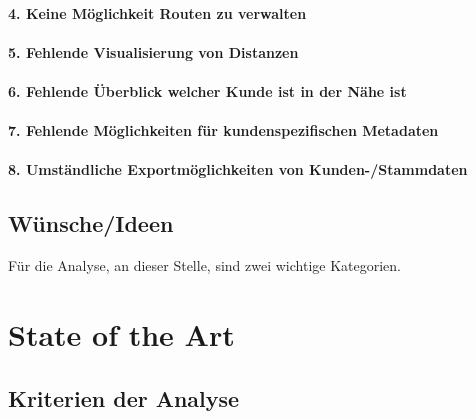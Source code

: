 \documentclass[../Bachelorarbeit.tex]{subfiles}
\begin{document}
\paragraph*{4. Keine Möglichkeit Routen zu verwalten }
\label{p4}

\paragraph*{5. Fehlende Visualisierung von Distanzen}
\label{p5}

\paragraph*{6. Fehlende Überblick welcher Kunde ist in der Nähe ist}
\label{p6}

\paragraph*{7. Fehlende Möglichkeiten für kundenspezifischen Metadaten}
\label{p7}

\paragraph*{8. Umständliche Exportmöglichkeiten von Kunden-/Stammdaten}
\label{p8}


\subsection*{Wünsche/Ideen}
\label{subsubsec:Ergebnisse der Interviews:ideen}
 
Für die Analyse, an dieser Stelle, sind zwei wichtige Kategorien.  


\section{State of the Art}
\label{chap:analyse:sec:sota}


\subsection{Kriterien der Analyse}
\label{chap:analyse:sec:sota:sec:kriterien_der_analyse}

\end{document}
